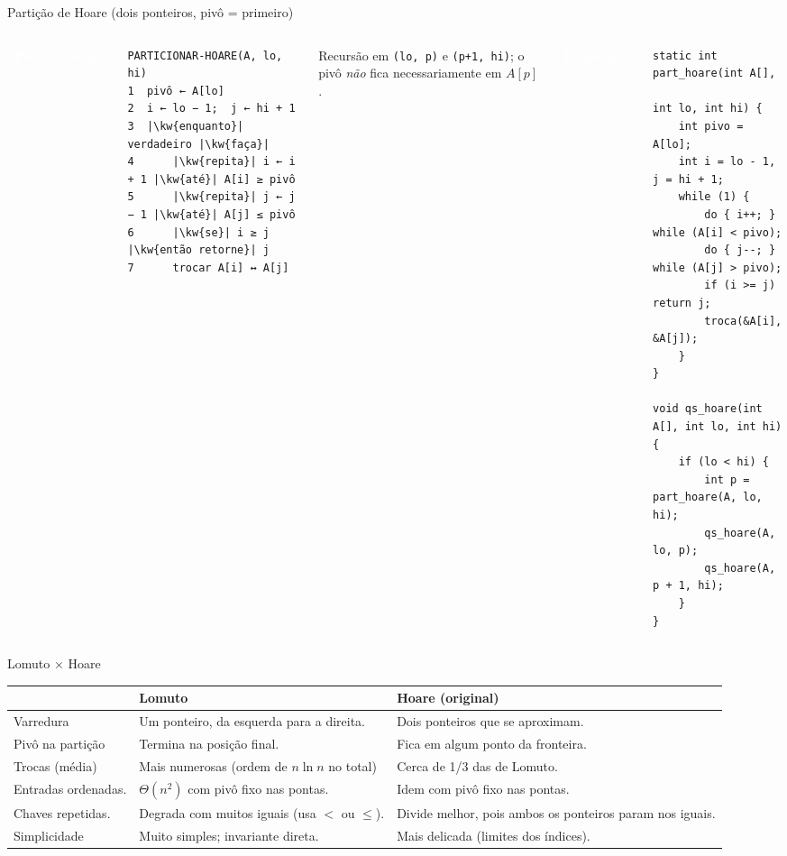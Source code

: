 \documentclass[aspectratio=169,10pt]{beamer}
\newcommand{\kw}[1]{\textbf{#1}}
\newcommand{\tagbox}[3]{\colorbox{#1}{\textcolor{#2}{\strut\scriptsize\bfseries\ #3\ }}}
\begin{document}
\begin{frame}[fragile]{Partição de Hoare (dois ponteiros, pivô = primeiro)}
 \begin{columns}[T]
   \tagbox{mblue}{white}{Pseudocódigo}\vspace{0.3em}
\begin{lstlisting}[style=pseudo]
PARTICIONAR-HOARE(A, lo, hi)
1  pivô ← A[lo]
2  i ← lo − 1;  j ← hi + 1
3  |\kw{enquanto}| verdadeiro |\kw{faça}|
4      |\kw{repita}| i ← i + 1 |\kw{até}| A[i] ≥ pivô
5      |\kw{repita}| j ← j − 1 |\kw{até}| A[j] ≤ pivô
6      |\kw{se}| i ≥ j |\kw{então retorne}| j
7      trocar A[i] ↔ A[j]
\end{lstlisting}
   {\scriptsize Recursão em \texttt{(lo, p)} e \texttt{(p+1, hi)}; o pivô \emph{não} fica necessariamente em $A[p]$ \cite{clrs22}.}
   \tagbox{mred}{white}{Linguagem C}\vspace{0.3em}
\begin{lstlisting}[style=codesmall]
static int part_hoare(int A[],
                      int lo, int hi) {
    int pivo = A[lo];
    int i = lo - 1, j = hi + 1;
    while (1) {
        do { i++; } while (A[i] < pivo);
        do { j--; } while (A[j] > pivo);
        if (i >= j) return j;
        troca(&A[i], &A[j]);
    }
}

void qs_hoare(int A[], int lo, int hi) {
    if (lo < hi) {
        int p = part_hoare(A, lo, hi);
        qs_hoare(A, lo, p);
        qs_hoare(A, p + 1, hi);
    }
}
\end{lstlisting}
 \end{columns}
\end{frame}

\begin{frame}{Lomuto $\times$ Hoare}
 \centering\footnotesize
 \renewcommand{\arraystretch}{1.25}
 \begin{tabular}{@{}p{2.6cm}p{4.2cm}p{4.2cm}@{}}
  \toprule
  & \textbf{Lomuto} & \textbf{Hoare (original)} \\
  \midrule
  Varredura & Um ponteiro, da esquerda para a direita. & Dois ponteiros que se aproximam. \\
  Pivô na partição & Termina na posição final. & Fica em algum ponto da fronteira. \\
  Trocas (média) & Mais numerosas (ordem de $n\ln n$ no total) & Cerca de 1/3 das de Lomuto. \cite{knuth98,sedgewick78} \\
  Entradas ordenadas. & $\Theta(n^2)$ com pivô fixo nas pontas. & Idem com pivô fixo nas pontas. \\
  Chaves repetidas. & Degrada com muitos iguais (usa $<$ ou $\le$). & Divide melhor, pois ambos os ponteiros param nos iguais. \\
  Simplicidade & Muito simples; invariante direta. & Mais delicada (limites dos índices). \\
  \bottomrule
 \end{tabular}
\end{frame}
\end{document}
